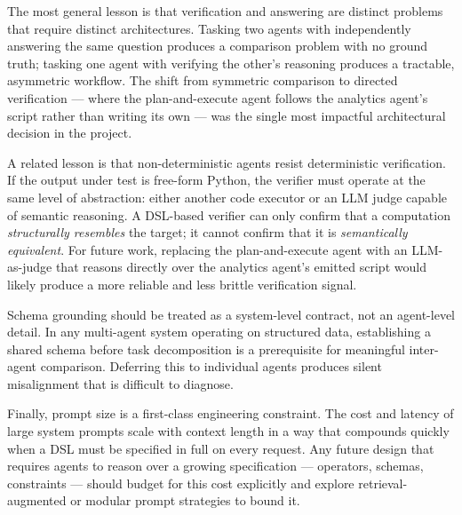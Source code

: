 The most general lesson is that verification and answering are distinct problems that require distinct architectures.
Tasking two agents with independently answering the same question produces a comparison problem with no ground truth; tasking one agent with verifying the other's reasoning produces a tractable, asymmetric workflow.
The shift from symmetric comparison to directed verification --- where the plan-and-execute agent follows the analytics agent's script rather than writing its own --- was the single most impactful architectural decision in the project.

A related lesson is that non-deterministic agents resist deterministic verification.
If the output under test is free-form Python, the verifier must operate at the same level of abstraction: either another code executor or an LLM judge capable of semantic reasoning.
A DSL-based verifier can only confirm that a computation \emph{structurally resembles} the target; it cannot confirm that it is \emph{semantically equivalent}.
For future work, replacing the plan-and-execute agent with an LLM-as-judge that reasons directly over the analytics agent's emitted script would likely produce a more reliable and less brittle verification signal.

Schema grounding should be treated as a system-level contract, not an agent-level detail.
In any multi-agent system operating on structured data, establishing a shared schema before task decomposition is a prerequisite for meaningful inter-agent comparison.
Deferring this to individual agents produces silent misalignment that is difficult to diagnose.

Finally, prompt size is a first-class engineering constraint.
The cost and latency of large system prompts scale with context length in a way that compounds quickly when a DSL must be specified in full on every request.
Any future design that requires agents to reason over a growing specification --- operators, schemas, constraints --- should budget for this cost explicitly and explore retrieval-augmented or modular prompt strategies to bound it.
